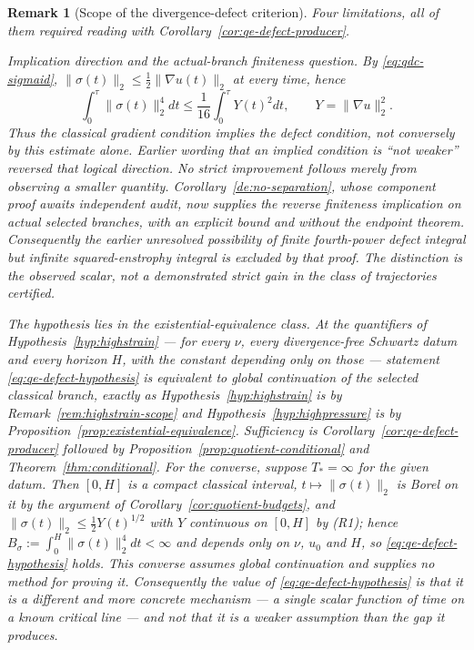 \documentclass[11pt]{article}
\newtheorem{remark}[theorem]{Remark}
\theoremstyle{definition}
\theoremstyle{plain}
\newcommand{\norm}[1]{\lVert #1\rVert}
\begin{document}
\begin{remark}[Scope of the divergence-defect criterion]
\label{rem:qe-defect-scope}
Four limitations, all of them required reading with
Corollary~\ref{cor:qe-defect-producer}.

\emph{Implication direction and the actual-branch finiteness question.}
By \eqref{eq:qdc-sigmaid},
$\norm{\sigma(t)}_2\le\frac12\norm{\nabla u(t)}_2$ at every time, hence
\[
 \int_0^\tau\norm{\sigma(t)}_2^4dt
 \le\frac1{16}\int_0^\tau Y(t)^2dt,
 \qquad Y=\norm{\nabla u}_2^2.
\]
Thus the classical gradient condition implies the defect condition, not
conversely by this estimate alone.  Earlier wording that an implied
condition is ``not weaker'' reversed that logical direction.  No strict
improvement follows merely from observing a smaller quantity.
Corollary~\ref{de:no-separation}, whose component proof awaits independent
audit, now supplies the reverse finiteness implication on actual selected
branches, with an explicit bound and without the endpoint theorem.
Consequently the earlier unresolved possibility of finite fourth-power
defect integral but infinite squared-enstrophy integral is excluded by
that proof.  The distinction is the observed scalar, not a demonstrated
strict gain in the class of trajectories certified.

\emph{The hypothesis lies in the existential-equivalence class.}  At the
quantifiers of Hypothesis~\ref{hyp:highstrain} --- for every $\nu$, every
divergence-free Schwartz datum and every horizon $H$, with the constant
depending only on those --- statement \eqref{eq:qe-defect-hypothesis} is
\emph{equivalent} to global continuation of the selected classical branch,
exactly as Hypothesis~\ref{hyp:highstrain} is by
Remark~\ref{rem:highstrain-scope} and
Hypothesis~\ref{hyp:highpressure} is by
Proposition~\ref{prop:existential-equivalence}.
Sufficiency is Corollary~\ref{cor:qe-defect-producer} followed by
Proposition~\ref{prop:quotient-conditional} and
Theorem~\ref{thm:conditional}.  For the converse, suppose $T_*=\infty$ for
the given datum.  Then $[0,H]$ is a compact classical interval,
$t\mapsto\norm{\sigma(t)}_2$ is Borel on it by the argument of
Corollary~\ref{cor:quotient-budgets}, and
$\norm{\sigma(t)}_2\le\frac12Y(t)^{1/2}$ with $Y$ continuous on $[0,H]$ by
(R1); hence $B_\sigma:=\int_0^H\norm{\sigma(t)}_2^4dt<\infty$ and depends
only on $\nu$, $u_0$ and $H$, so \eqref{eq:qe-defect-hypothesis} holds.
This converse assumes global continuation and supplies no method for
proving it.  Consequently the value of \eqref{eq:qe-defect-hypothesis} is
that it is a different and more concrete mechanism --- a single scalar
function of time on a known critical line --- and not that it is a weaker
assumption than the gap it produces.


\end{remark}
\end{document}

